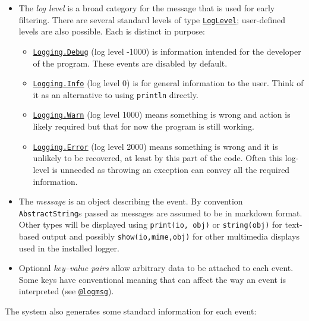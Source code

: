 \begin{itemize}
\item The \emph{log level} is a broad category for the message that is used for early filtering. There are several standard levels of type \hyperlink{10879938884267981707}{\texttt{LogLevel}}; user-defined levels are also possible. Each is distinct in purpose:

\begin{itemize}
\item \href{@ref}{\texttt{Logging.Debug}} (log level -1000) is information intended for the developer of the program. These events are disabled by default.


\item \href{@ref}{\texttt{Logging.Info}} (log level 0) is for general information to the user. Think of it as an alternative to using \texttt{println} directly.


\item \href{@ref}{\texttt{Logging.Warn}} (log level 1000) means something is wrong and action is likely required but that for now the program is still working.


\item \href{@ref}{\texttt{Logging.Error}} (log level 2000) means something is wrong and it is unlikely to be recovered, at least by this part of the code. Often this log-level is unneeded as throwing an exception can convey all the required information.

\end{itemize}

\item The \emph{message}  is an object describing the event. By convention \texttt{AbstractString}s passed as messages are assumed to be in markdown format. Other types will be displayed using \texttt{print(io, obj)} or \texttt{string(obj)} for text-based output and possibly \texttt{show(io,mime,obj)} for other multimedia displays used in the installed logger.


\item Optional \emph{key–value pairs} allow arbitrary data to be attached to each event. Some keys have conventional meaning that can affect the way an event is interpreted (see \hyperlink{2787319849348710857}{\texttt{@logmsg}}).

\end{itemize}


The system also generates some standard information for each event:



